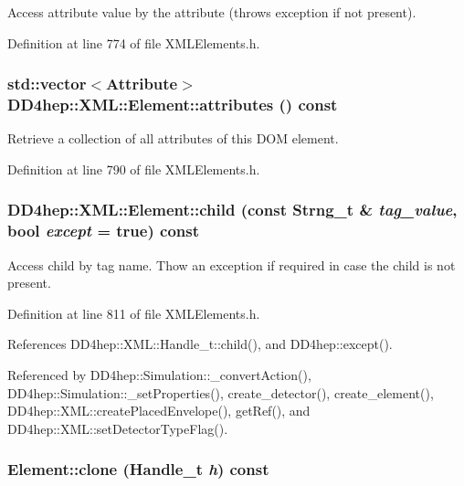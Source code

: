 Access attribute value by the attribute (throws exception if not present). 

Definition at line 774 of file XMLElements.h.\hypertarget{class_d_d4hep_1_1_x_m_l_1_1_element_a66b2ab211629a9f748b7504d21609cc0}{
\subsubsection[{attributes}]{\setlength{\rightskip}{0pt plus 5cm}std::vector$<${\bf Attribute}$>$ DD4hep::XML::Element::attributes () const}}
\label{class_d_d4hep_1_1_x_m_l_1_1_element_a66b2ab211629a9f748b7504d21609cc0}


Retrieve a collection of all attributes of this DOM element. 

Definition at line 790 of file XMLElements.h.\hypertarget{class_d_d4hep_1_1_x_m_l_1_1_element_a8f38a8aee8b5006d8eabe3d47e240f34}{
\subsubsection[{child}]{ DD4hep::XML::Element::child (const {\bf Strng\_\-t} \& {\em tag\_\-value}, \/  bool {\em except} = {\ttfamily true}) const}}
\label{class_d_d4hep_1_1_x_m_l_1_1_element_a8f38a8aee8b5006d8eabe3d47e240f34}


Access child by tag name. Thow an exception if required in case the child is not present. 

Definition at line 811 of file XMLElements.h.

References DD4hep::XML::Handle\_\-t::child(), and DD4hep::except().

Referenced by DD4hep::Simulation::\_\-convertAction(), DD4hep::Simulation::\_\-setProperties(), create\_\-detector(), create\_\-element(), DD4hep::XML::createPlacedEnvelope(), getRef(), and DD4hep::XML::setDetectorTypeFlag().\hypertarget{class_d_d4hep_1_1_x_m_l_1_1_element_a4d422a42cb61ee89846807725d86e498}{
\subsubsection[{clone}]{ Element::clone ({\bf Handle\_\-t} {\em h}) const}}
\label{class_d_d4hep_1_1_x_m_l_1_1_element_a4d422a42cb61ee89846807725d86e498}


